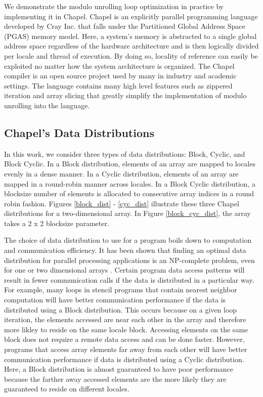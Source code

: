 We demonstrate the modulo unrolling loop optimization in practice by implementing it in Chapel. Chapel is an explicitly parallel programming language developed by Cray Inc. that falls under the Partitioned Global Address Space (PGAS) memory model. Here, a system's memory is abstracted to a single global address space regardless of the hardware architecture and is then logically divided per locale and thread of execution. By doing so, locality of reference can easily be exploited no matter how the system architecture is organized. The Chapel compiler is an open source project used by many in industry and academic settings. The language contains many high level features such as zippered iteration and array slicing that greatly simplify the implementation of modulo unrolling into the language.

\subsection{Chapel's Data Distributions} 

In this work, we consider three types of data distributions: Block, Cyclic, and Block Cyclic. In a Block distribution, elements of an array are mapped to locales evenly in a dense manner. In a Cyclic distribution, elements of an array are mapped in a round-robin manner across locales. In a Block Cyclic distribution, a blocksize number of elements is allocated to consecutive array indices in a round robin fashion. Figures \ref{block_dist} - \ref{cyc_dist} illustrate these three Chapel distributions for a two-dimensional array. In Figure \ref{block_cyc_dist}, the array takes a 2 x 2 blocksize parameter. 

The choice of data distribution to use for a program boils down to computation and communication efficiency. It has been shown that finding an optimal data distribution for parallel processing applications is an NP-complete problem, even for one or two dimensional arrays \cite{mace1987memory}. Certain program data access patterns will result in fewer communication calls if the data is distributed in a particular way. For example, many loops in stencil programs that contain nearest neighbor computation will have better communication performance if the data is distributed using a Block distribution. This occurs because on a given loop iteration, the elements accessed are near each other in the array and therefore more likley to reside on the same locale block. Accessing elements on the same block does not require a remote data access and can be done faster. However, programs that access array elements far away from each other will have better communication performance if data is distributed using a Cyclic distribution. Here, a Block distribution is almost guaranteed to have poor performance because the farther away accessed elements are the more likely they are guaranteed to reside on different locales. 

